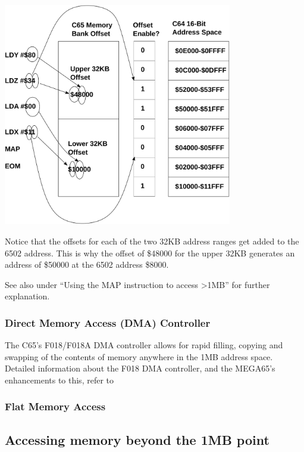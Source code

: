 \begin{center}
  \includegraphics[width=0.75\textwidth]{images/illustrations/map-instruction-operation-example1.pdf}
\end{center}

Notice that the offsets for each of the two 32KB address ranges get added to the 6502 address.
This is why the offset of \$48000 for the upper 32KB generates an address of \$50000 at the 6502
address \$8000.

See also under ``Using the MAP instruction to access >1MB'' for further explanation.

\subsubsection{Direct Memory Access (DMA) Controller}

The C65's F018/F018A DMA controller allows for rapid filling, copying and swapping of the contents of memory
anywhere in the 1MB address space. Detailed information about the F018 DMA controller, and the MEGA65's
enhancements to this, refer to 

\subsubsection{Flat Memory Access}

\subsection{Accessing memory beyond the 1MB point}
\label{sec:extended-memory}

